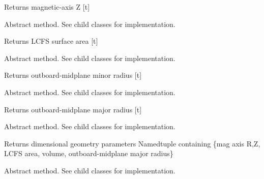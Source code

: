 \documentclass[letterpaper,10pt,english]{sphinxmanual}
\begin{document}
\begin{fulllineitems}
\begin{fulllineitems}
Returns magnetic-axis Z {[}t{]}

\end{fulllineitems}


\begin{fulllineitems}
\label{eqtools:eqtools.core.Equilibrium.getAreaLCFS}
Abstract method.  See child classes for implementation.

Returns LCFS surface area {[}t{]}

\end{fulllineitems}


\begin{fulllineitems}
\label{eqtools:eqtools.core.Equilibrium.getAOut}
Abstract method.  See child classes for implementation.

Returns outboard-midplane minor radius {[}t{]}

\end{fulllineitems}


\begin{fulllineitems}
\label{eqtools:eqtools.core.Equilibrium.getRmidOut}
Abstract method.  See child classes for implementation.

Returns outboard-midplane major radius {[}t{]}

\end{fulllineitems}


\begin{fulllineitems}
\label{eqtools:eqtools.core.Equilibrium.getGeometry}
Abstract method.  See child classes for implementation.

Returns dimensional geometry parameters
Namedtuple containing \{mag axis R,Z, LCFS area, volume, outboard-midplane major radius\}

\end{fulllineitems}


\begin{fulllineitems}
\label{eqtools:eqtools.core.Equilibrium.getQProfile}
Abstract method.  See child classes for implementation.


\end{fulllineitems}
\end{fulllineitems}
\end{document}
